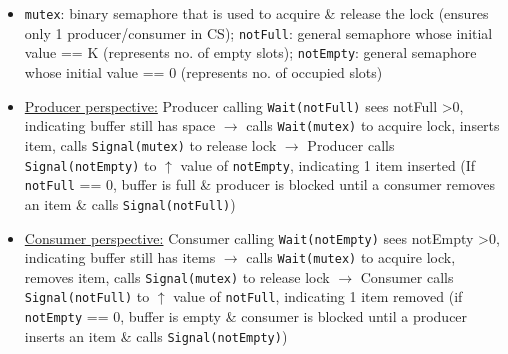 \documentclass[landscape]{article}
\begin{document}
\begin{multicols*}{6}
\begin{itemize}
      \begin{itemize}
        \item \verb|mutex|: binary semaphore that is used to acquire \& release the lock (ensures only 1 producer/consumer in CS); \verb|notFull|: general semaphore whose initial value == K (represents no. of empty slots); \verb|notEmpty|: general semaphore whose initial value == 0 (represents no. of occupied slots)
        \item \underline{Producer perspective:} Producer calling \verb|Wait(notFull)| sees notFull \textgreater 0, indicating buffer still has space $\rightarrow$ calls \verb|Wait(mutex)| to acquire lock, inserts item, calls \verb|Signal(mutex)| to release lock $\rightarrow$ Producer calls \verb|Signal(notEmpty)| to $\uparrow$ value of \verb|notEmpty|, indicating 1 item inserted (If \verb|notFull| == 0, buffer is full \& producer is blocked until a consumer removes an item \& calls \verb|Signal(notFull)|)
        \item \underline{Consumer perspective:} Consumer calling \verb|Wait(notEmpty)| sees notEmpty \textgreater 0, indicating buffer still has items $\rightarrow$ calls \verb|Wait(mutex)| to acquire lock, removes item, calls \verb|Signal(mutex)| to release lock $\rightarrow$ Consumer calls \verb|Signal(notFull)| to $\uparrow$ value of \verb|notFull|, indicating 1 item removed (if \verb|notEmpty| == 0, buffer is empty \& consumer is blocked until a producer inserts an item \& calls \verb|Signal(notEmpty)|)
      \end{itemize}
    \end{itemize}


\end{multicols*}
\end{document}

